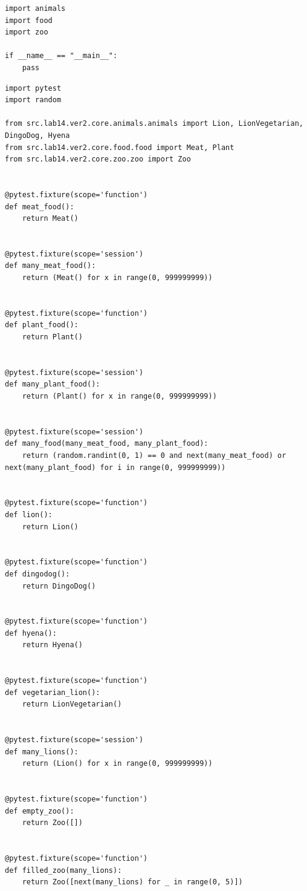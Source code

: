 \documentclass[a4paper,14pt]{extarticle}
\begin{document}
\begin{verbatim}
import animals
import food
import zoo

if __name__ == "__main__":
    pass
\end{verbatim}
\begin{verbatim}
import pytest
import random

from src.lab14.ver2.core.animals.animals import Lion, LionVegetarian, DingoDog, Hyena
from src.lab14.ver2.core.food.food import Meat, Plant
from src.lab14.ver2.core.zoo.zoo import Zoo


@pytest.fixture(scope='function')
def meat_food():
    return Meat()


@pytest.fixture(scope='session')
def many_meat_food():
    return (Meat() for x in range(0, 999999999))


@pytest.fixture(scope='function')
def plant_food():
    return Plant()


@pytest.fixture(scope='session')
def many_plant_food():
    return (Plant() for x in range(0, 999999999))


@pytest.fixture(scope='session')
def many_food(many_meat_food, many_plant_food):
    return (random.randint(0, 1) == 0 and next(many_meat_food) or next(many_plant_food) for i in range(0, 999999999))


@pytest.fixture(scope='function')
def lion():
    return Lion()


@pytest.fixture(scope='function')
def dingodog():
    return DingoDog()


@pytest.fixture(scope='function')
def hyena():
    return Hyena()


@pytest.fixture(scope='function')
def vegetarian_lion():
    return LionVegetarian()


@pytest.fixture(scope='session')
def many_lions():
    return (Lion() for x in range(0, 999999999))


@pytest.fixture(scope='function')
def empty_zoo():
    return Zoo([])


@pytest.fixture(scope='function')
def filled_zoo(many_lions):
    return Zoo([next(many_lions) for _ in range(0, 5)])

\end{verbatim}
\end{document}
